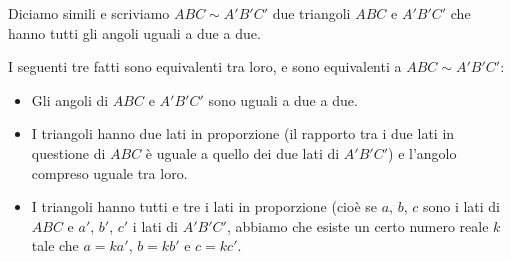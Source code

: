 \documentclass[11pt]{scrartcl}
\begin{document}
	\begin{definition}[Similitudine]
		Diciamo simili e scriviamo $ABC \sim A'B'C'$ due triangoli $ABC$ e $A'B'C'$ che hanno tutti gli angoli uguali a due a due.
	\end{definition}
	\begin{theorem}
		I seguenti tre fatti sono equivalenti tra loro, e sono equivalenti a $ABC \sim A'B'C'$:
		\begin{itemize}
			\item Gli angoli di $ABC$ e $A'B'C'$ sono uguali a due a due.
			\item I triangoli hanno due lati in proporzione (il rapporto tra i due lati in questione di $ABC$ è uguale a quello dei due lati di $A'B'C'$) e l'angolo compreso uguale tra loro.
			\item I triangoli hanno tutti e tre i lati in proporzione (cioè se $a$, $b$, $c$ sono i lati di $ABC$ e $a'$, $b'$, $c'$ i lati di $A'B'C'$, abbiamo che esiste un certo numero reale $k$ tale che $a=ka'$, $b=kb'$ e $c=kc'$.
		\end{itemize}
	\end{theorem}
\end{document}

